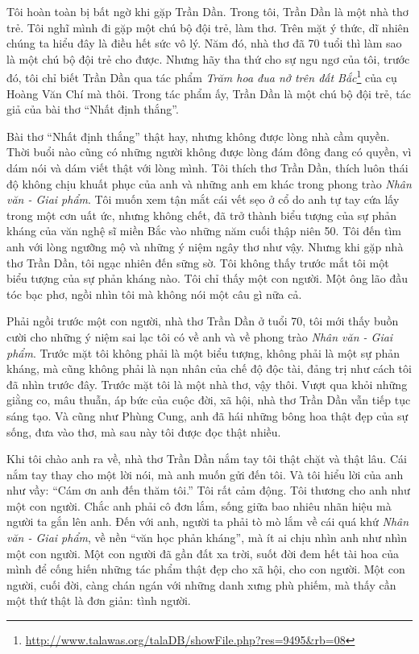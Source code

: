 \documentclass[../main.tex]{subfiles}
\begin{document}
\begin{multicols}{2}
Tôi hoàn toàn bị bất ngờ khi gặp Trần Dần. Trong tôi, Trần Dần là một nhà thơ trẻ. Tôi nghĩ mình đi gặp một chú bộ đội trẻ, làm thơ. Trên mặt ý thức, dĩ nhiên chúng ta hiểu đây là điều hết sức vô lý. Năm đó, nhà thơ đã 70 tuổi thì làm sao là một chú bộ đội trẻ cho được. Nhưng hãy tha thứ cho sự ngu ngơ của tôi, trước đó, tôi chỉ biết Trần Dần qua tác phẩm \textit{Trăm hoa đua nở trên đất Bắc}\footnote{\url{http://www.talawas.org/talaDB/showFile.php?res=9495&rb=08}} của cụ Hoàng Văn Chí mà thôi. Trong tác phẩm ấy, Trần Dần là một chú bộ đội trẻ, tác giả của bài thơ “Nhất định thắng”. 
 
Bài thơ “Nhất định thắng” thật hay, nhưng không được lòng nhà cầm quyền. Thời buổi nào cũng có những người không được lòng đám đông đang có quyền, vì dám nói và dám viết thật với lòng mình. Tôi thích thơ Trần Dần, thích luôn thái độ không chịu khuất phục của anh và những anh em khác trong phong trào \textit{Nhân văn -  Giai phẩm}. Tôi muốn xem tận mắt cái vết sẹo ở cổ do anh tự tay cứa lấy trong một cơn uất ức, nhưng không chết, đã trở thành biểu tượng của sự phản kháng của văn nghệ sĩ miền Bắc vào những năm cuối thập niên 50. Tôi đến tìm anh với lòng ngưỡng mộ và những ý niệm ngây thơ như vậy. Nhưng khi gặp nhà thơ Trần Dần, tôi ngạc nhiên đến sững sờ. Tôi không thấy trước mắt tôi một biểu tượng của sự phản kháng nào. Tôi chỉ thấy một con người. Một ông lão đầu tóc bạc phơ, ngồi nhìn tôi mà không nói một câu gì nữa cả. 
 
Phải ngồi trước một con người, nhà thơ Trần Dần ở tuổi 70, tôi mới thấy buồn cười cho những ý niệm sai lạc tôi có về anh và về phong trào \textit{Nhân văn - Giai phẩm}. Trước mặt tôi không phải là một biểu tượng, không phải là một sự phản kháng, mà cũng không phải là nạn nhân của chế độ độc tài, đảng trị như cách tôi đã nhìn trước đây. Trước mặt tôi là một nhà thơ, vậy thôi. Vượt qua khỏi những giằng co, mâu thuẫn, áp bức của cuộc đời, xã hội, nhà thơ Trần Dần vẫn tiếp tục sáng tạo. Và cũng như Phùng Cung, anh đã hái những bông hoa thật đẹp của sự sống, đưa vào thơ, mà sau này tôi được đọc thật nhiều. 
 
Khi tôi chào anh ra về, nhà thơ Trần Dần nắm tay tôi thật chặt và thật lâu. Cái nắm tay thay cho một lời nói, mà anh muốn gửi đến tôi. Và tôi hiểu lời của anh như vầy: “Cám ơn anh đến thăm tôi.” Tôi rất cảm động. Tôi thương cho anh như một con người. Chắc anh phải cô đơn lắm, sống giữa bao nhiêu nhãn hiệu mà người ta gắn lên anh. Đến với anh, người ta phải tò mò lắm về cái quá khứ \textit{Nhân văn - Giai phẩm}, về nền “văn học phản kháng”, mà ít ai chịu nhìn anh như nhìn một con người. Một con người đã gần đất xa trời, suốt đời đem hết tài hoa của mình để cống hiến những tác phẩm thật đẹp cho xã hội, cho con người. Một con người, cuối đời, càng chán ngán với những danh xưng phù phiếm, mà thấy cần một thứ thật là đơn giản: tình người. 
 

\end{multicols}
\end{document}
